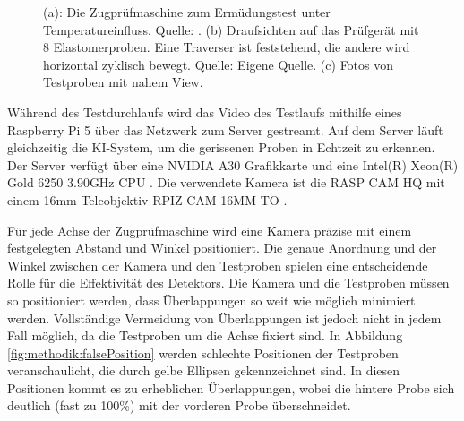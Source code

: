     \begin{figure}[htbp]
        \centering
            \caption[Die verwendete Zugprüfmaschine.]{(a): Die Zugprüfmaschine zum Ermüdungstest unter Temperatureinfluss. Quelle: \cite{zyklischePrüfung}. (b) Draufsichten auf das Prüfgerät mit 8 Elastomerproben. Eine Traverser ist feststehend, die andere wird horizontal zyklisch bewegt. Quelle: Eigene Quelle. (c) Fotos von Testproben mit nahem View.}
            \label{fig:methodik:myZugprüfmaschine}
    \end{figure}

    Während des Testdurchlaufs wird das Video des Testlaufs mithilfe eines Raspberry Pi 5 über das Netzwerk zum Server gestreamt. Auf dem Server läuft gleichzeitig die KI-System, um die gerissenen Proben in Echtzeit zu erkennen. Der Server verfügt über eine NVIDIA A30 Grafikkarte \cite{graphiccard} und eine Intel(R) Xeon(R) Gold 6250 3.90GHz CPU \cite{cpu}. Die verwendete Kamera ist die RASP CAM HQ \cite{camera} mit einem 16mm Teleobjektiv RPIZ CAM 16MM TO \cite{camera}. 

    Für jede Achse der Zugprüfmaschine wird eine Kamera präzise mit einem festgelegten Abstand und Winkel positioniert. Die genaue Anordnung und der Winkel zwischen der Kamera und den Testproben spielen eine entscheidende Rolle für die Effektivität des Detektors. Die Kamera und die Testproben müssen so positioniert werden, dass Überlappungen so weit wie möglich minimiert werden. Vollständige Vermeidung von Überlappungen ist jedoch nicht in jedem Fall möglich, da die Testproben um die Achse fixiert sind. In Abbildung \ref{fig:methodik:falsePosition} werden schlechte Positionen der Testproben veranschaulicht, die durch gelbe Ellipsen gekennzeichnet sind. In diesen Positionen kommt es zu erheblichen Überlappungen, wobei die hintere Probe sich deutlich (fast zu 100\%) mit der vorderen Probe überschneidet.

